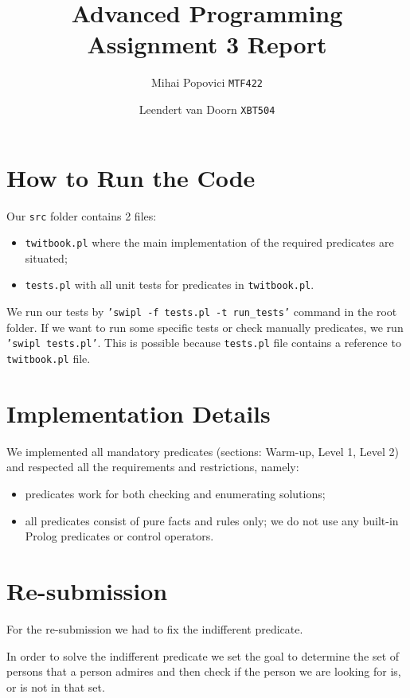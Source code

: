 \documentclass{article}
\title{Advanced Programming Assignment 3 Report}
\author{Mihai Popovici \texttt{MTF422} \and Leendert van Doorn \texttt{XBT504}}
\begin{document}
\maketitle

\section{How to Run the Code}
Our \texttt{src} folder contains 2 files:
\begin{itemize}
	\item \texttt{twitbook.pl} where the main implementation of the required predicates are situated;
	\item \texttt{tests.pl} with all unit tests for predicates in \texttt{twitbook.pl}.  
\end{itemize} 
We run our tests by \texttt{'swipl -f tests.pl -t run\_tests'} command in the root folder.
If we want to run some specific tests or check manually predicates, we run \texttt{'swipl tests.pl'}. This is possible because \texttt{tests.pl} file contains a reference to \texttt{twitbook.pl} file.

\section{Implementation Details}
We implemented all mandatory predicates (sections: Warm-up, Level 1, Level 2) and respected all the requirements and restrictions, namely:
\begin{itemize}
	\item predicates work for both checking and enumerating solutions;
	\item all predicates consist of pure facts and rules only; we do not use any built-in Prolog predicates or control operators.  
\end{itemize} 

\section{Re-submission}
For the re-submission we had to fix the indifferent predicate.

In order to solve the indifferent predicate we set the goal to determine the set of persons that a person admires and then check if the person we are looking for is, or is not in that set.
\end{document}
